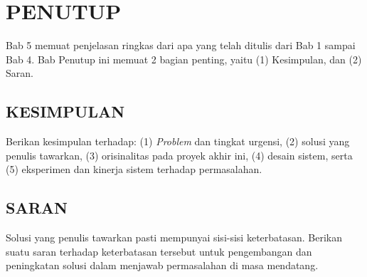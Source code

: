 \chapter{PENUTUP}

Bab 5 memuat penjelasan ringkas dari apa yang telah ditulis dari Bab 1 sampai Bab 4.
Bab Penutup ini memuat 2 bagian penting, yaitu (1) Kesimpulan, dan (2) Saran.

\section{KESIMPULAN}

Berikan kesimpulan terhadap: (1) \textit{Problem} dan tingkat urgensi, (2) solusi yang
penulis tawarkan, (3) orisinalitas pada proyek akhir ini, (4) desain sistem, serta
(5) eksperimen dan kinerja sistem terhadap permasalahan.

\section{SARAN}

Solusi yang penulis tawarkan pasti mempunyai sisi-sisi keterbatasan. Berikan suatu
saran terhadap keterbatasan tersebut untuk pengembangan dan peningkatan solusi dalam
menjawab permasalahan di masa mendatang.